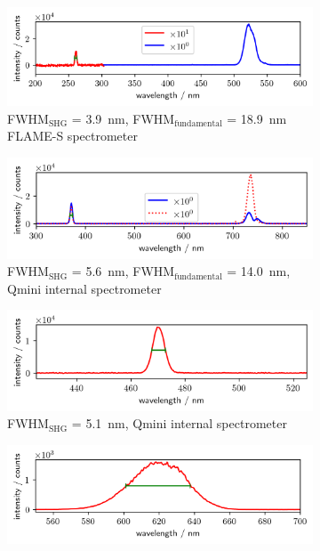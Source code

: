 \documentclass[twoside,openright,listof=numbered]{scrreprt}
\begin{document}
\begin{figure}[hbtp]
\begin{subfigure}[b]{\textwidth}
\centering
\includegraphics[scale=1]{images/spectra/SpectrumExampleNoFilter_260nm.png}
\caption{FWHM$_{\mathrm{SHG}}$ = \SI{3.9}{\nano\meter}, FWHM$_{\mathrm{fundamental}}$ = \SI{18.9}{\nano\meter} FLAME-S spectrometer}
\end{subfigure}
\begin{subfigure}[b]{\textwidth}
\centering
\includegraphics[scale=1]{images/spectra/SpectrumExampleNoFilter_371nm.png}
\caption{FWHM$_{\mathrm{SHG}}$ = \SI{5.6}{\nano\meter}, FWHM$_{\mathrm{fundamental}}$ = \SI{14.0}{\nano\meter}, Qmini internal spectrometer\label{fig:SHG_offCenterComp}}
\end{subfigure}
\begin{subfigure}[b]{\textwidth}
\centering
\includegraphics[scale=1]{images/spectra/SpectrumExampleNoFilter_470nm.png}
\caption{FWHM$_{\mathrm{SHG}}$ = \SI{5.1}{\nano\meter}, Qmini internal spectrometer}
\end{subfigure}
\begin{subfigure}[b]{\textwidth}
\centering
\includegraphics[scale=1]{images/spectra/ActonMonochromatorCharacterisation/620nmSpectrumProbe.png}

\end{subfigure}
\end{figure}
\end{document}
